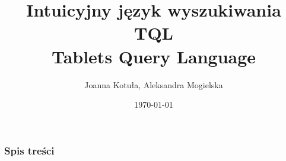 \documentclass[xcolor=dvipsnames,10pt]{beamer}
\author{Joanna Kotuła, Aleksandra Mogielska}
\institute[...]{Wydział Matematyki, Informatyki i Mechaniki\\
Uniwersytet Warszawski}
\title[Intuicyjny język wyszukiwania TQL (Tablets Query Language)]{\bf  Intuicyjny język wyszukiwania TQL \\
Tablets Query Language}
\date{\today}
\begin{document}
\begin{frame}
     \titlepage
\end{frame}

\begin{frame}
     \frametitle{Spis treści}
     \tableofcontents
\end{frame}
%    
% 
% 






% 

\end{document}
